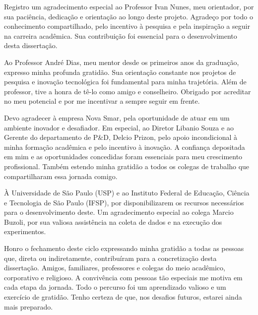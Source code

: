 \begin{agradecimentos}
    Registro um agradecimento especial ao Professor Ivan Nunes, meu orientador, por sua paciência, dedicação e orientação ao longo deste projeto. Agradeço por todo o conhecimento compartilhado, pelo incentivo à pesquisa e pela inspiração a seguir na carreira acadêmica. Sua contribuição foi essencial para o desenvolvimento desta dissertação.

    Ao Professor André Dias, meu mentor desde os primeiros anos da graduação, expresso minha profunda gratidão. Sua orientação constante nos projetos de pesquisa e inovação tecnológica foi fundamental para minha trajetória. Além de professor, tive a honra de tê-lo como amigo e conselheiro. Obrigado por acreditar no meu potencial e por me incentivar a sempre seguir em frente.

    Devo agradecer à empresa Nova Smar, pela oportunidade de atuar em um ambiente inovador e desafiador. Em especial, ao Diretor Libanio Souza e ao Gerente do departamento de P\&D, Delcio Prizon, pelo apoio incondicional à minha formação acadêmica e pelo incentivo à inovação. A confiança depositada em mim e as oportunidades concedidas foram essenciais para meu crescimento profissional. Também estendo minha gratidão a todos os colegas de trabalho que compartilharam essa jornada comigo.

    À Universidade de São Paulo (USP) e ao Instituto Federal de Educação, Ciência e Tecnologia de São Paulo (IFSP), por disponibilizarem os recursos necessários para o desenvolvimento deste. Um agradecimento especial ao colega Marcio Buzoli, por sua valiosa assistência na coleta de dados e na execução dos experimentos.

    Honro o fechamento deste ciclo expressando minha gratidão a todas as pessoas que, direta ou indiretamente, contribuíram para a concretização desta dissertação. Amigos, familiares, professores e colegas do meio acadêmico, corporativo e religioso. A convivência com pessoas tão especiais me motiva em cada etapa da jornada. Todo o percurso foi um aprendizado valioso e um exercício de gratidão. Tenho certeza de que, nos desafios futuros, estarei ainda mais preparado.
	
\end{agradecimentos}